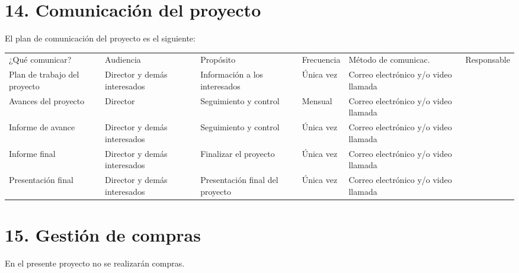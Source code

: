 \documentclass[11pt]{charter}
\begin{document}
\pagebreak

\section*{14. Comunicación del proyecto}
\label{sec:comunicaciones}

El plan de comunicación del proyecto es el siguiente:

\begin{table}[htpb]
\centering
\begin{tabularx}{\linewidth}{@{}|X|C{2.4cm}|C{3cm}|C{1.8cm}|C{2cm}|C{2.1cm}|@{}}
\hline
{} 
           \\ \hline
{} 
¿Qué comunicar? 							& Audiencia 											& Propósito 											& Frecuencia & Método de comunicac. 									& Responsable \\ \hline
Plan de trabajo del proyecto  & Director y demás interesados   	& Información a los interesados 	& Única vez  & Correo electrónico y/o video llamada   & \authorname \\ \hline
Avances del proyecto 					& Director  											& Seguimiento y control						& Mensual    & Correo electrónico y/o video llamada   & \authorname \\ \hline
Informe de avance 						& Director y demás interesados		& Seguimiento y control						& Única vez  & Correo electrónico y/o video llamada   & \authorname \\ \hline
Informe final									& Director y demás interesados		& Finalizar el proyecto 					& Única vez  & Correo electrónico y/o video llamada   & \authorname \\ \hline
Presentación final						& Director y demás interesados 		& Presentación final del proyecto	& Única vez  & Correo electrónico y/o video llamada   & \authorname \\ \hline
\end{tabularx}
\end{table}

\section*{15. Gestión de compras}
\label{sec:compras}

En el presente proyecto no se realizarán compras. 
\end{document}
